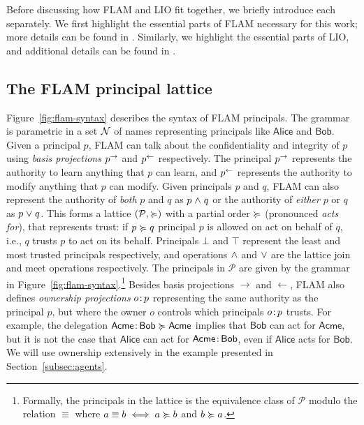 Before discussing how FLAM and LIO fit together, we briefly introduce each separately. We first highlight the essential parts of FLAM necessary for this work; more details can be found in \cite{Arden:2015:FA:2859845.2859998}. Similarly, we highlight the essential parts of LIO, and additional details can be found in \cite{SRMMlio}.

\subsection{The FLAM principal lattice}
Figure~\ref{fig:flam-syntax} describes the syntax of FLAM principals. The grammar is parametric in a set $\mathcal{N}$ of names representing principals like $\mathsf{Alice}$ and $\mathsf{Bob}$. Given a principal $p$, FLAM can talk about the confidentiality and integrity of $p$ using \emph{basis projections} $p^{\rightarrow}$ and $p^{\leftarrow}$ respectively. The principal $p^{\rightarrow}$ represents the authority to learn anything that $p$ can learn, and $p^{\leftarrow}$ represents the authority to modify anything that $p$ can modify. Given principals $p$ and $q$, FLAM can also represent the authority of \emph{both} $p$ and $q$ as $p \mathrel{\land} q$ or the authority of \emph{either} $p$ or $q$ as $p \mathrel{\lor} q$. This forms a lattice $(\mathcal{P}, \succcurlyeq)$ with a partial order $\succcurlyeq$ (pronounced \emph{acts for}), that represents trust: if $p \succcurlyeq q$ principal $p$ is allowed on act on behalf of $q$, i.e., $q$ trusts $p$ to act on its behalf. Principals $\bot$ and $\top$ represent the least and most trusted principals respectively, and operations $\mathrel{\land}$ and $\mathrel{\lor}$ are the lattice join and meet operations respectively. The principals in $\mathcal{P}$ are given by the grammar in Figure~\ref{fig:flam-syntax}.\footnote{Formally, the principals in the lattice is the equivalence class of $\mathcal{P}$ modulo the relation $\equiv$ where $a \equiv b \iff a \succcurlyeq b$ and $b \succcurlyeq a$.} Besides basis projections $\rightarrow$ and $\leftarrow$, FLAM also defines \emph{ownership projections} $o \colon \!p$ representing the same authority as the principal $p$, but where the owner $o$ controls which principals $o \colon \!p$ trusts. For example, the delegation $\mathsf{Acme} \colon \!\mathsf{Bob} \succcurlyeq \mathsf{Acme}$ implies that $\mathsf{Bob}$ can act for $\mathsf{Acme}$, but it is not the case that $\mathsf{Alice}$ can act for $\mathsf{Acme} \colon \!\mathsf{Bob}$, even if $\mathsf{Alice}$ acts for $\mathsf{Bob}$. We will use ownership extensively in the example presented in Section~\ref{subsec:agents}.

